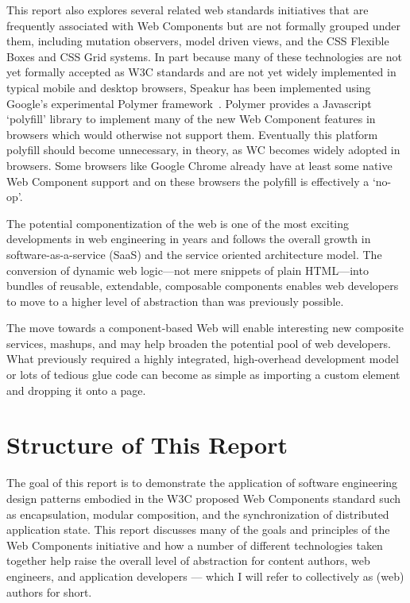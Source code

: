 This report also explores several related web standards initiatives that are frequently associated with Web Components 
but are not formally grouped under them, including mutation observers,
model driven views, 
and the CSS Flexible Boxes
and CSS Grid
systems. 
In part because many of these technologies are not yet formally accepted as W3C standards and are not yet widely implemented in typical mobile and desktop browsers, 
Speakur has been implemented using Google's experimental Polymer framework~\cite{polymercontributors2015}.
Polymer provides a Javascript `polyfill'
library to implement many of the new Web Component features in browsers which would otherwise not support them. 
Eventually this platform polyfill should become unnecessary, in theory, as WC becomes widely adopted in browsers.
Some browsers like Google Chrome 
already have at least some native Web Component support and on these browsers the polyfill is effectively a `no-op'.

The potential componentization of the web is one of the most exciting developments in web engineering in years and follows the overall growth in software-as-a-service (SaaS) 
and the service oriented architecture
model. 
The conversion of dynamic web logic---not mere snippets of plain HTML---into bundles of reusable, extendable, composable components enables web developers to move to a higher level of abstraction than was previously possible.

The move towards a component-based Web will enable interesting new composite services, mashups, and may help broaden the potential pool of web developers. 
What previously required a highly integrated, high-overhead development model or lots of tedious glue code can become as simple as importing a custom element and dropping it onto a page.


\section{Structure of This Report}
%

The goal of this report is to demonstrate the application of software engineering design patterns embodied in the W3C proposed Web Components standard such as encapsulation, modular composition, and the synchronization of distributed application state. 
This report discusses many of the goals and principles of the Web Components initiative and how a number of different technologies taken together help raise the overall level of abstraction for content authors, web engineers, and application developers --- which I will refer to collectively as (web) authors for short.

